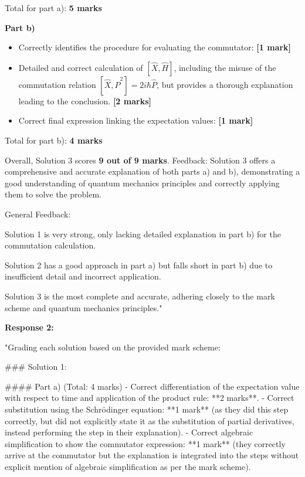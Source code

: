 \documentclass[a4paper,11pt]{article}
\begin{document}
Total for part a): \textbf{5 marks}

\textbf{Part b)}

\begin{itemize}
    \item Correctly identifies the procedure for evaluating the commutator: \textbf{[1 mark]}
    \item Detailed and correct calculation of \(\left[ \hat{X}, \hat{H}\right]\), including the misuse of the commutation relation \( \left[ \hat{X}, \hat{P}^2 \right] = 2i\hbar\hat{P} \), but provides a thorough explanation leading to the conclusion. \textbf{[2 marks]}
    \item Correct final expression linking the expectation values: \textbf{[1 mark]}
\end{itemize}

Total for part b): \textbf{4 marks}

Overall, Solution 3 scores \textbf{9 out of 9 marks}. Feedback: Solution 3 offers a comprehensive and accurate explanation of both parts a) and b), demonstrating a good understanding of quantum mechanics principles and correctly applying them to solve the problem.

General Feedback:

Solution 1 is very strong, only lacking detailed explanation in part b) for the commutation calculation.

Solution 2 has a good approach in part a) but falls short in part b) due to insufficient detail and incorrect application.

Solution 3 is the most complete and accurate, adhering closely to the mark scheme and quantum mechanics principles."

\textbf{Response 2:}

"Grading each solution based on the provided mark scheme:

### Solution 1:

#### Part a) (Total: 4 marks)
- Correct differentiation of the expectation value with respect to time and application of the product rule: **2 marks**.
- Correct substitution using the Schrödinger equation: **1 mark** (as they did this step correctly, but did not explicitly state it as the substitution of partial derivatives, instead performing the step in their explanation).
- Correct algebraic simplification to show the commutator expression: **1 mark** (they correctly arrive at the commutator but the explanation is integrated into the steps without explicit mention of algebraic simplification as per the mark scheme).
\end{document}
